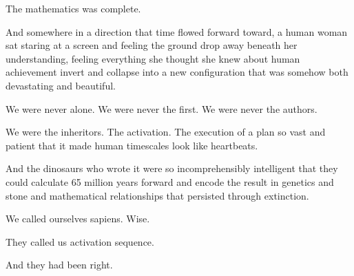 The mathematics was complete.

And somewhere in a direction that time flowed forward toward, a human woman sat staring at a screen and feeling the ground drop away beneath her understanding, feeling everything she thought she knew about human achievement invert and collapse into a new configuration that was somehow both devastating and beautiful.

We were never alone. We were never the first. We were never the authors.

We were the inheritors. The activation. The execution of a plan so vast and patient that it made human timescales look like heartbeats.

And the dinosaurs who wrote it were so incomprehensibly intelligent that they could calculate 65 million years forward and encode the result in genetics and stone and mathematical relationships that persisted through extinction.

We called ourselves sapiens. Wise.

They called us activation sequence.

And they had been right.

